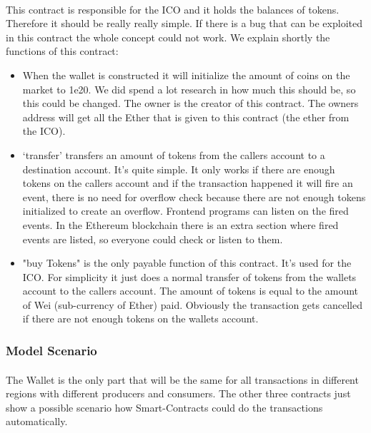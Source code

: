 \documentclass{scrartcl}
\begin{document}
	\paragraph{}
	This contract is responsible for the ICO and it holds the balances of tokens. Therefore it should be really really simple. If there is a bug that can be exploited in this contract the whole concept could not work. We explain shortly the functions of this contract:
	
	\begin{itemize}
		\item When the wallet is constructed it will initialize the amount of coins on the market to 1e20. We did spend a lot research in how much this should be, so this could be changed. The owner is the creator of this contract. The owners address will get all the Ether that is given to this contract (the ether from the ICO).
		\item ‘transfer’ transfers an amount of tokens from the callers account to a destination account. It’s quite simple. It only works if there are enough tokens on the callers account and if the transaction happened it will fire an event, there is no need for overflow check because there are not enough tokens initialized to create an overflow. Frontend programs can listen on the fired events. In the Ethereum blockchain there is an extra section where fired events are listed, so everyone could check or listen to them.
		\item "buy Tokens" is the only payable function of this contract. It’s used for the ICO. For simplicity it just does a normal transfer of tokens from the wallets account to the callers account. The amount of tokens is equal to the amount of Wei (sub-currency of Ether) paid. Obviously the transaction gets cancelled if there are not enough tokens on the wallets account.
	\end{itemize}
		
	\subsubsection{Model Scenario}
	
	\paragraph{}
	The Wallet is the only part that will be the same for all transactions in different regions with different producers and consumers. The other three contracts just show a possible scenario how Smart-Contracts could do the transactions automatically.
	
\end{document}
